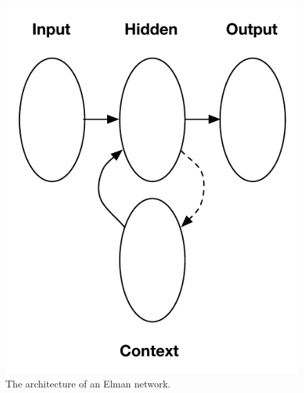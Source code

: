 \documentclass{acm_proc_article-sp}
\begin{document}
\begin{figure}
\begin{center}
\includegraphics[scale=.8]{Images/elman.pdf}
\caption{The architecture of an Elman network.}
\label{fig:elman}
\end{center}
\end{figure}
\end{document}
